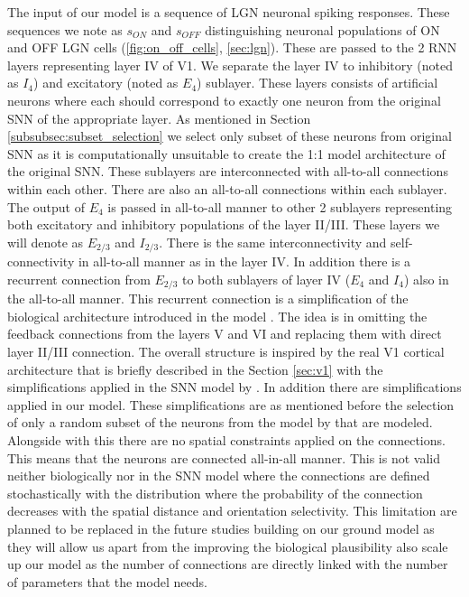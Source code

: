 The input of our model is a sequence of LGN neuronal spiking responses. These sequences we note as $s_{ON}$ and $s_{OFF}$ distinguishing neuronal populations of ON and OFF LGN cells (\ref{fig:on_off_cells}, \ref{sec:lgn}). These are passed to the 2 RNN layers representing layer IV of V1. We separate the layer IV to inhibitory (noted as $I_4$) and excitatory (noted as $E_4$) sublayer. These layers consists of artificial neurons where each should correspond to exactly one neuron from the original SNN of the appropriate layer. As mentioned in Section \ref{subsubsec:subset_selection} we select only subset of these neurons from original SNN as it is computationally unsuitable to create the 1:1 model architecture of the original SNN. These sublayers are interconnected with all-to-all connections within each other. There are also an all-to-all connections within each sublayer. The output of $E_4$ is passed in all-to-all manner to other 2 sublayers representing both excitatory and inhibitory populations of the layer II/III. These layers we will denote as $E_{2/3}$ and $I_{2/3}$. There is the same interconnectivity and self-connectivity in all-to-all manner as in the layer IV. In addition there is a recurrent connection from $E_{2/3}$ to both sublayers of layer IV ($E_4$ and $I_4$) also in the all-to-all manner. This recurrent connection is a simplification of the biological architecture introduced in the model \citet{antolik2024comprehensive}. The idea is in omitting the feedback connections from the layers V and VI and replacing them with direct layer II/III connection. The overall structure is inspired by the real V1 cortical architecture that is briefly described in the Section \ref{sec:v1} with the simplifications applied in the SNN model by \citet{antolik2024comprehensive}. In addition there are simplifications applied in our model. These simplifications are as mentioned before the selection of only a random subset of the neurons from the model by \citet{antolik2024comprehensive} that are modeled. Alongside with this there are no spatial constraints applied on the connections. This means that the neurons are connected all-in-all manner. This is not valid neither biologically nor in the SNN model where the connections are defined stochastically with the distribution where the probability of the connection decreases with the spatial distance and orientation selectivity. This limitation are planned to be replaced in the future studies building on our ground model as they will allow us apart from the improving the biological plausibility also scale up our model as the number of connections are directly linked with the number of parameters that the model needs.

